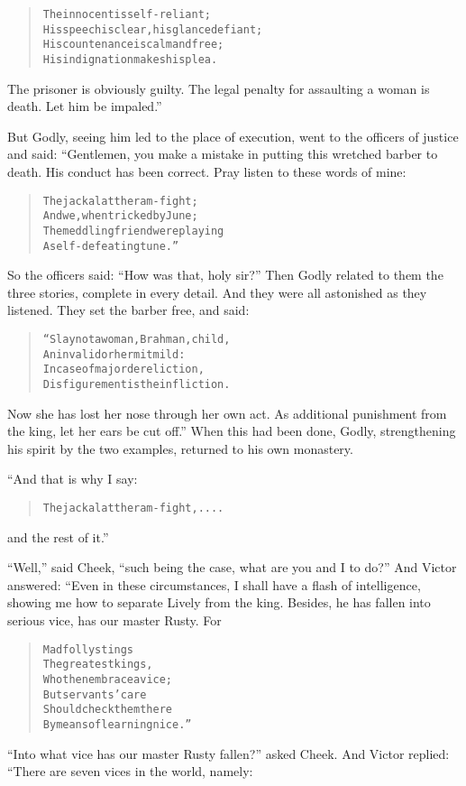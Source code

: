\documentclass[article, twoside, 10pt]{memoir}
\renewenvironment{verbatim}{%
\begin{quote}%
\vskip -10pt%
\begin{alltt}\normalfont\small}{\end{alltt}%
\end{quote}%
\vskip -10pt
} %
\begin{document}
\begin{verbatim}
The innocent is self-reliant;
His speech is clear, his glance defiant;
His countenance is calm and free;
His indignation makes his plea.
\end{verbatim}
The prisoner is obviously guilty. The legal penalty for assaulting
a woman is death. Let him be impaled.”

But Godly, seeing him led to the place of execution, went to the
officers of justice and said: “Gentlemen, you make a mistake in
putting this wretched barber to death. His conduct has been
correct. Pray listen to these words of mine:

\begin{verbatim}
The jackal at the ram-fight;
And we, when tricked by June;
The meddling friend{\textemdash}were playing
A self-defeating tune.”
\end{verbatim}
So the officers said: ``How was that, holy sir?'' Then Godly
related to them the three stories, complete in every detail. And
they were all astonished as they listened. They set the barber
free, and said:

\begin{verbatim}
“Slay not a woman, Brahman, child,
An invalid or hermit mild:
In case of major dereliction,
Disfigurement is the infliction.
\end{verbatim}
Now she has lost her nose through her own act. As additional
punishment from the king, let her ears be cut off.” When this had
been done, Godly, strengthening his spirit by the two examples,
returned to his own monastery.

“And that is why I say:

\begin{verbatim}
The jackal at the ram-fight, ....
\end{verbatim}
and the rest of it.”

``Well,'' said Cheek,
``such being the case, what are you and I to do?'' And Victor
answered: “Even in these circumstances, I shall have a flash of
intelligence, showing me how to separate Lively from the king.
Besides, he has fallen into serious vice, has our master Rusty.
For

\begin{verbatim}
Mad folly stings
The greatest kings,
    Who then embrace a vice;
But servants' care
Should check them there
    By means of learning nice.”
\end{verbatim}
``Into what vice has our master Rusty fallen?'' asked Cheek. And
Victor replied: “There are seven vices in the world, namely:
\end{document}
